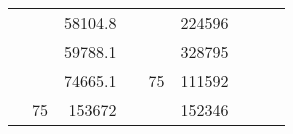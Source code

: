 \begin{table}[H]
\begin{tabular}{|ccrccrccc}
\multicolumn{1}{|c|}{\cellcolor[HTML]{FFFFC7}}                                & \multicolumn{1}{c|}{\cellcolor[HTML]{DAE8FC}}                      & \multicolumn{1}{r|}{\cellcolor[HTML]{DAE8FC}58104.8}   & \multicolumn{1}{c|}{\cellcolor[HTML]{FFFFC7}}                                & \multicolumn{1}{c|}{\cellcolor[HTML]{DAE8FC}}                       & \multicolumn{1}{r|}{\cellcolor[HTML]{DDFDFF}224596}    &                                                                              &                                                                    &                                                        \\ \cline{3-3} \cline{6-6}
\multicolumn{1}{|c|}{\cellcolor[HTML]{FFFFC7}}                                & \multicolumn{1}{c|}{\cellcolor[HTML]{DAE8FC}}                      & \multicolumn{1}{r|}{\cellcolor[HTML]{DDFDFF}59788.1}   & \multicolumn{1}{c|}{\cellcolor[HTML]{FFFFC7}}                                & \multicolumn{1}{c|}{\cellcolor[HTML]{DAE8FC}}                       & \multicolumn{1}{r|}{\cellcolor[HTML]{DAE8FC}328795}    &                                                                              &                                                                    &                                                        \\ \cline{3-3} \cline{6-6}
\multicolumn{1}{|c|}{\cellcolor[HTML]{FFFFC7}}                                & \multicolumn{1}{c|}{\cellcolor[HTML]{DAE8FC}}                      & \multicolumn{1}{r|}{\cellcolor[HTML]{DAE8FC}74665.1}   & \multicolumn{1}{c|}{\cellcolor[HTML]{FFFFC7}}                                & \multicolumn{1}{c|}{\multirow{-10}{*}{\cellcolor[HTML]{DAE8FC}75}}  & \multicolumn{1}{r|}{\cellcolor[HTML]{DDFDFF}111592}    &                                                                              &                                                                    &                                                        \\ \cline{3-3} \cline{5-6}
\multicolumn{1}{|c|}{\cellcolor[HTML]{FFFFC7}}                                & \multicolumn{1}{c|}{\multirow{-10}{*}{\cellcolor[HTML]{DAE8FC}75}} & \multicolumn{1}{r|}{\cellcolor[HTML]{DDFDFF}153672}    & \multicolumn{1}{c|}{\cellcolor[HTML]{FFFFC7}}                                & \multicolumn{1}{c|}{\cellcolor[HTML]{DDFDFF}}                       & \multicolumn{1}{r|}{\cellcolor[HTML]{DAE8FC}152346}    &                                                                              &                                                                    &                                                        \\ \cline{2-3} \cline{6-6}

\end{tabular}
\end{table}
